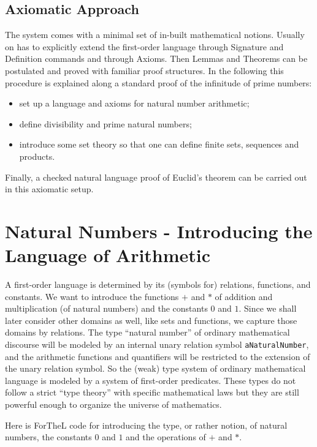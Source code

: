 \documentclass[11pt]{article}
\begin{document}
\subsection{Axiomatic Approach}

The \Naproche{} system
comes with a minimal set of in-built mathematical notions.
Usually on has to explicitly extend the first-order
language through Signature and Definition commands and through
Axioms. Then Lemmas and Theorems can be postulated and proved
with familiar proof structures. In the following this procedure
is explained along a standard proof of the infinitude of 
prime numbers:
\begin{itemize}
\item
set up a language and axioms for natural number arithmetic;
\item
define divisibility and prime natural numbers;
\item
introduce some set theory so that one can define
finite sets, sequences and products.
\end{itemize}
Finally, a checked natural language proof of Euclid's theorem
can be carried out in this axiomatic setup.

\section{Natural Numbers - Introducing the Language of Arithmetic}

A first-order language is determined by its (symbols for)
relations, functions, and constants. We want to introduce 
the functions $+$ and $*$ of addition and multiplication
(of natural numbers)
and the constants $0$ and $1$. Since we shall 
later consider other domains as well, like sets and functions,
we capture those domains by relations. The type ``natural number''
of ordinary mathematical discourse will be modeled by an
internal unary relation symbol
\verb+aNaturalNumber+, and the arithmetic functions and 
quantifiers will be
restricted to the extension of the unary relation symbol.
So the (weak) type system of ordinary mathematical language
is modeled by a system of first-order predicates. These
types do not follow a strict ``type theory'' with specific
mathematical laws but they are still powerful enough
to organize the universe of mathematics.

Here is ForTheL code for introducing the type, or rather
notion, of natural numbers, the constants $0$ and $1$
and the operations of $+$ and $*$.
 
\end{document}
